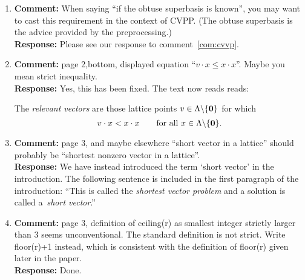 \documentclass[a4paper,10pt]{article}
\begin{document}
\begin{enumerate}
\item\textbf{Comment:}  
When saying ``if the obtuse superbasis is known'', you may want to cast this requirement in the context of CVPP. (The obtuse superbasis is the advice provided by the preprocessing.) 
\\\textbf{Response:}
Please see our response to comment~\ref{com:cvvp}.

\item\textbf{Comment:}  
page 2,bottom, displayed equation ``$v \cdot x \leq x \cdot x$''. Maybe you mean strict inequality.
\\\textbf{Response:}
Yes, this has been fixed.  The text now reads reads:

The \emph{relevant vectors} are those lattice points $v \in \Lambda \backslash  \{\boldsymbol{0}\}$ for which  
\[
v \cdot x < x \cdot x \qquad \text{for all $x \in \Lambda \backslash  \{\boldsymbol{0}\}$}.
\]



\item\textbf{Comment:}  
page 3, and maybe elsewhere ``short vector in a lattice'' should probably be ``shortest nonzero vector in a lattice''. 
\\\textbf{Response:}
We have instead introduced the term `short vector' in the introduction.  The following sentence is included in the first paragraph of the introduction: ``This is called the \emph{shortest vector problem} and a solution is called a~\emph{short vector}.''

\item\textbf{Comment:}  
page 3, definition of ceiling(r) as smallest integer strictly larger than 3 seems unconventional. The standard definition is not strict. Write floor(r)+1 instead, which is consistent with the definition of floor(r) given later in the paper. 
\\\textbf{Response:}
Done.


\end{enumerate}
\end{document}
